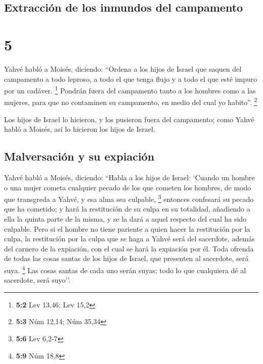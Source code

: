 \hypertarget{extracciuxf3n-de-los-inmundos-del-campamento}{%
\subsection{Extracción de los inmundos del
campamento}\label{extracciuxf3n-de-los-inmundos-del-campamento}}

\hypertarget{section-4}{%
\section{5}\label{section-4}}

 Yahvé habló a Moisés, diciendo:  ``Ordena a
los hijos de Israel que saquen del campamento a todo leproso, a todo el
que tenga flujo y a todo el que esté impuro por un cadáver. \footnote{\textbf{5:2}
  Lev 13,46; Lev 15,2}  Pondrán fuera del campamento tanto
a los hombres como a las mujeres, para que no contaminen su campamento,
en medio del cual yo habito''. \footnote{\textbf{5:3} Núm 12,14; Núm
  35,34}

 Los hijos de Israel lo hicieron, y los pusieron fuera del
campamento; como Yahvé habló a Moisés, así lo hicieron los hijos de
Israel.

\hypertarget{malversaciuxf3n-y-su-expiaciuxf3n}{%
\subsection{Malversación y su
expiación}\label{malversaciuxf3n-y-su-expiaciuxf3n}}

 Yahvé habló a Moisés, diciendo:  ``Habla a
los hijos de Israel: `Cuando un hombre o una mujer cometa cualquier
pecado de los que cometen los hombres, de modo que transgreda a Yahvé, y
esa alma sea culpable, \footnote{\textbf{5:6} Lev 6,2-7} 
entonces confesará su pecado que ha cometido; y hará la restitución de
su culpa en su totalidad, añadiendo a ella la quinta parte de la misma,
y se la dará a aquel respecto del cual ha sido culpable. 
Pero si el hombre no tiene pariente a quien hacer la restitución por la
culpa, la restitución por la culpa que se haga a Yahvé será del
sacerdote, además del carnero de la expiación, con el cual se hará la
expiación por él.  Toda ofrenda de todas las cosas santas
de los hijos de Israel, que presenten al sacerdote, será suya.
\footnote{\textbf{5:9} Núm 18,8}  Las cosas santas de
cada uno serán suyas; todo lo que cualquiera dé al sacerdote, será
suyo''.

